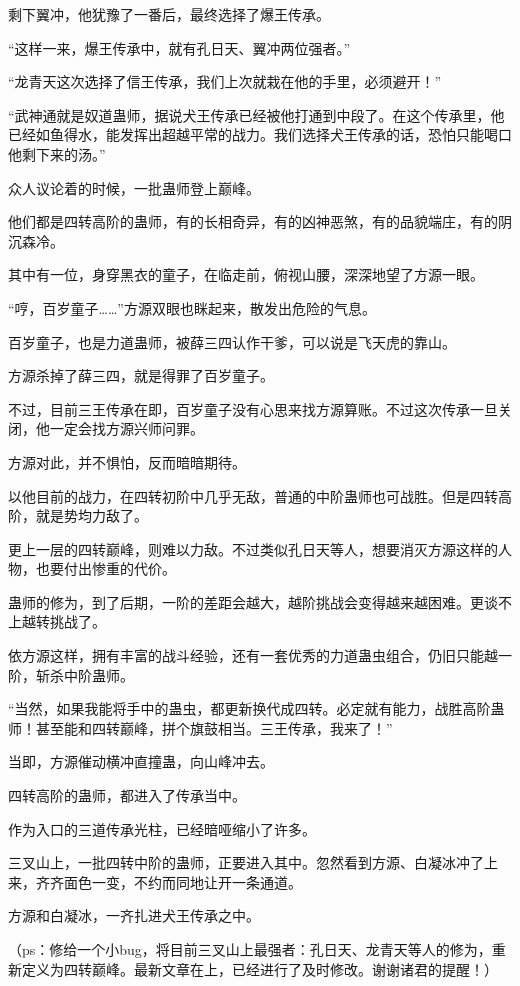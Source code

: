 \begin{this_body}
剩下翼冲，他犹豫了一番后，最终选择了爆王传承。

“这样一来，爆王传承中，就有孔日天、翼冲两位强者。”

“龙青天这次选择了信王传承，我们上次就栽在他的手里，必须避开！”

“武神通就是奴道蛊师，据说犬王传承已经被他打通到中段了。在这个传承里，他已经如鱼得水，能发挥出超越平常的战力。我们选择犬王传承的话，恐怕只能喝口他剩下来的汤。”

众人议论着的时候，一批蛊师登上巅峰。

他们都是四转高阶的蛊师，有的长相奇异，有的凶神恶煞，有的品貌端庄，有的阴沉森冷。

其中有一位，身穿黑衣的童子，在临走前，俯视山腰，深深地望了方源一眼。

“哼，百岁童子……”方源双眼也眯起来，散发出危险的气息。

百岁童子，也是力道蛊师，被薛三四认作干爹，可以说是飞天虎的靠山。

方源杀掉了薛三四，就是得罪了百岁童子。

不过，目前三王传承在即，百岁童子没有心思来找方源算账。不过这次传承一旦关闭，他一定会找方源兴师问罪。

方源对此，并不惧怕，反而暗暗期待。

以他目前的战力，在四转初阶中几乎无敌，普通的中阶蛊师也可战胜。但是四转高阶，就是势均力敌了。

更上一层的四转巅峰，则难以力敌。不过类似孔日天等人，想要消灭方源这样的人物，也要付出惨重的代价。

蛊师的修为，到了后期，一阶的差距会越大，越阶挑战会变得越来越困难。更谈不上越转挑战了。

依方源这样，拥有丰富的战斗经验，还有一套优秀的力道蛊虫组合，仍旧只能越一阶，斩杀中阶蛊师。

“当然，如果我能将手中的蛊虫，都更新换代成四转。必定就有能力，战胜高阶蛊师！甚至能和四转巅峰，拼个旗鼓相当。三王传承，我来了！”

当即，方源催动横冲直撞蛊，向山峰冲去。

四转高阶的蛊师，都进入了传承当中。

作为入口的三道传承光柱，已经暗哑缩小了许多。

三叉山上，一批四转中阶的蛊师，正要进入其中。忽然看到方源、白凝冰冲了上来，齐齐面色一变，不约而同地让开一条通道。

方源和白凝冰，一齐扎进犬王传承之中。

（ps：修给一个小bug，将目前三叉山上最强者：孔日天、龙青天等人的修为，重新定义为四转巅峰。最新文章在上，已经进行了及时修改。谢谢诸君的提醒！）

\end{this_body}

